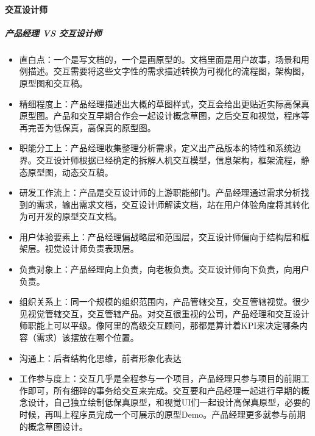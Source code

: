 \documentclass[letterpaper,10pt,english]{sphinxmanual}
\begin{document}
\paragraph{交互设计师}
\label{\detokenize{chapter_knowledge/IXD_design:id5}}

\subparagraph{产品经理 VS 交互设计师}
\label{\detokenize{chapter_knowledge/IXD_design:vs}}\begin{itemize}
\item {} 
直白点：一个是写文档的，一个是画原型的。文档里面是用户故事，场景和用例描述。交互需要将这些文字性的需求描述转换为可视化的流程图，架构图，原型图和交互稿。%
\begin{footnote}[628]\sphinxAtStartFootnote
{}
%
\end{footnote}

\item {} 
精细程度上：产品经理描述出大概的草图样式，交互会给出更贴近实际高保真原型图。产品和交互早期合作会一起设计概念草图，之后交互和视觉，程序等再完善为低保真，高保真的原型图。

\item {} 
职能分工上：产品经理收集整理分析需求，定义出产品版本的特性和系统边界。交互设计师根据已经确定的拆解人机交互模型，信息架构，框架流程，静态原型图，动态交互稿。

\item {} 
研发工作流上：产品是交互设计师的上游职能部门。产品经理通过需求分析找到的需求，输出需求文档，交互设计师解读文档，站在用户体验角度将其转化为可开发的原型交互文档。

\item {} 
用户体验要素上：产品经理偏战略层和范围层，交互设计师偏向于结构层和框架层。视觉设计师负责表现层。

\item {} 
负责对象上：产品经理向上负责，向老板负责。交互设计师向下负责，向用户负责。

\item {} 
组织关系上：同一个规模的组织范围内，产品管辖交互，交互管辖视觉。很少见视觉管辖交互，交互管辖产品。对交互很重视的公司，产品经理和交互设计师职能上可以平级。像阿里的高级交互顾问，那都是算计着KPI来决定哪条内容（需求）该摆放在哪个位置。

\item {} 
沟通上：后者结构化思维，前者形象化表达

\item {} 
工作参与度上：交互几乎是全程参与一个项目，产品经理只参与项目的前期工作即可，所有细碎的事务给交互来完成。交互要和产品经理一起进行早期的概念设计，自己独立绘制低保真原型，和视觉UI们一起设计高保真原型，必要的时候，再叫上程序员完成一个可展示的原型Demo。产品经理更多就参与前期的概念草图设计。


\end{itemize}
\end{document}
